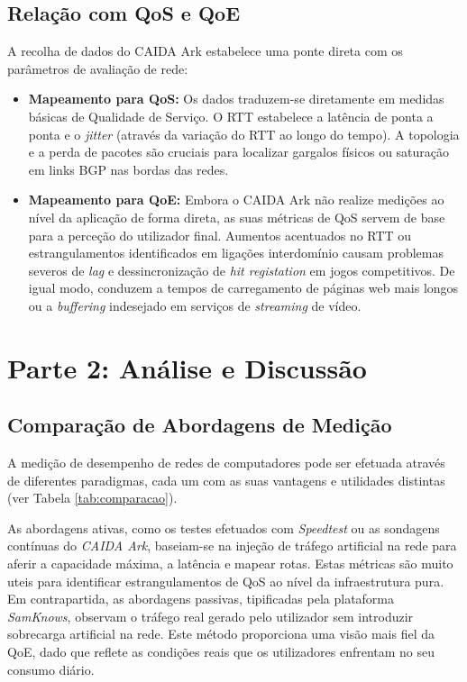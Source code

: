\documentclass[11pt, a4paper]{article}
\begin{document}
\subsection{Relação com QoS e QoE}
A recolha de dados do CAIDA Ark estabelece uma ponte direta com os parâmetros de avaliação de rede:
\begin{itemize}
    \item \textbf{Mapeamento para QoS:} Os dados traduzem-se diretamente em medidas básicas de Qualidade de Serviço. O RTT estabelece a latência de ponta a ponta e o \textit{jitter} (através da variação do RTT ao longo do tempo). A topologia e a perda de pacotes são cruciais para localizar gargalos físicos ou saturação em links BGP nas bordas das redes.
    \item \textbf{Mapeamento para QoE:} Embora o CAIDA Ark não realize medições ao nível da aplicação de forma direta, as suas métricas de QoS servem de base para a perceção do utilizador final. Aumentos acentuados no RTT ou estrangulamentos identificados em ligações interdomínio causam problemas severos de \textit{lag} e dessincronização de \textit{hit registation} em jogos competitivos. De igual modo, conduzem a tempos de carregamento de páginas web mais longos ou a \textit{buffering} indesejado em serviços de \textit{streaming} de vídeo.
\end{itemize}

\section{Parte 2: Análise e Discussão}

\subsection{Comparação de Abordagens de Medição}
A medição de desempenho de redes de computadores pode ser efetuada através de diferentes paradigmas, cada um com as suas vantagens e utilidades distintas (ver Tabela \ref{tab:comparacao}).

As abordagens ativas, como os testes efetuados com \textit{Speedtest} ou as sondagens contínuas do \textit{CAIDA Ark}, baseiam-se na injeção de tráfego artificial na rede para aferir a capacidade máxima, a latência e mapear rotas. Estas métricas são muito uteis para identificar estrangulamentos de QoS ao nível da infraestrutura pura. Em contrapartida, as abordagens passivas, tipificadas pela plataforma \textit{SamKnows}, observam o tráfego real gerado pelo utilizador sem introduzir sobrecarga artificial na rede. Este método proporciona uma visão mais fiel da QoE, dado que reflete as condições reais que os utilizadores enfrentam no seu consumo diário.
\end{document}
